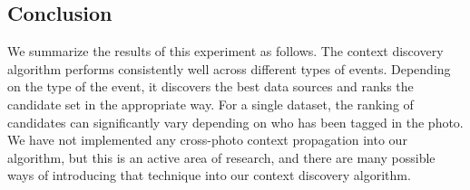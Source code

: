 \subsection{Conclusion}
We summarize the results of this experiment as follows. The context discovery algorithm performs consistently well across different types of events. Depending on the type of the event, it discovers the best data sources and ranks the candidate set in the appropriate way. For a single dataset, the ranking of candidates can significantly vary depending on who has been tagged in the photo. We have not implemented any cross-photo context propagation into our algorithm, but this is an active area of research, and there are many possible ways of introducing that technique into our context discovery algorithm.



